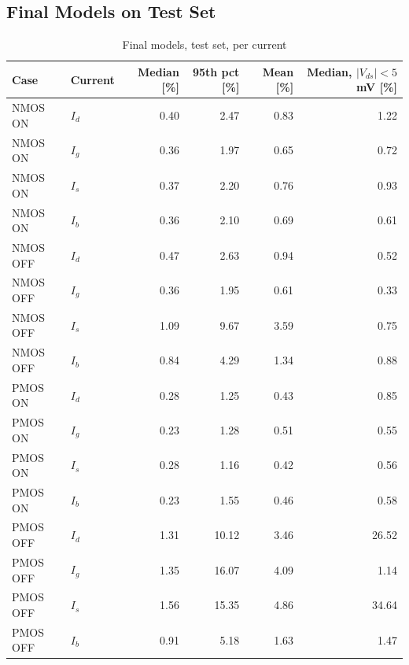 \documentclass[11pt,a4paper]{article}
\begin{document}
\subsection{Final Models on Test Set}
\begin{table}[H]\centering\small
\caption{Final models, test set (1{,}500 samples per case; errors mean over four currents)}
\end{table}

\begin{table}[H]\centering\scriptsize
\caption{Final models, test set, per current}
\begin{tabular}{llrrrr}\toprule
Case & Current & Median [\%] & 95th pct [\%] & Mean [\%] & Median, $|V_{ds}|<5$mV [\%]\\\midrule
NMOS ON  & $I_d$ & 0.40 & 2.47 & 0.83 & 1.22\\
NMOS ON  & $I_g$ & 0.36 & 1.97 & 0.65 & 0.72\\
NMOS ON  & $I_s$ & 0.37 & 2.20 & 0.76 & 0.93\\
NMOS ON  & $I_b$ & 0.36 & 2.10 & 0.69 & 0.61\\
NMOS OFF & $I_d$ & 0.47 & 2.63 & 0.94 & 0.52\\
NMOS OFF & $I_g$ & 0.36 & 1.95 & 0.61 & 0.33\\
NMOS OFF & $I_s$ & 1.09 & 9.67 & 3.59 & 0.75\\
NMOS OFF & $I_b$ & 0.84 & 4.29 & 1.34 & 0.88\\
PMOS ON  & $I_d$ & 0.28 & 1.25 & 0.43 & 0.85\\
PMOS ON  & $I_g$ & 0.23 & 1.28 & 0.51 & 0.55\\
PMOS ON  & $I_s$ & 0.28 & 1.16 & 0.42 & 0.56\\
PMOS ON  & $I_b$ & 0.23 & 1.55 & 0.46 & 0.58\\
PMOS OFF & $I_d$ & 1.31 & 10.12 & 3.46 & 26.52\\
PMOS OFF & $I_g$ & 1.35 & 16.07 & 4.09 & 1.14\\
PMOS OFF & $I_s$ & 1.56 & 15.35 & 4.86 & 34.64\\
PMOS OFF & $I_b$ & 0.91 & 5.18 & 1.63 & 1.47\\
\bottomrule\end{tabular}\end{table}
\end{document}
